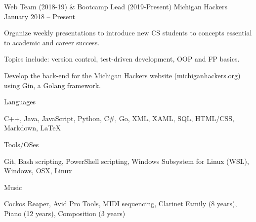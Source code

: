 \documentclass[]{awesome-cv}
\begin{document}
	\vspace{-4mm}
	\cventry
	{Web Team (2018-19) \& Bootcamp Lead (2019-Present)}
	{Michigan Hackers}
	{}
	{January 2018 – Present}
	{\begin{cvitems}
		\item {Organize weekly presentations to introduce new CS students to concepts essential to academic and career success.}
		\item {Topics include: version control, test-driven development, OOP and FP basics.}
		\item {Develop the back-end for the Michigan Hackers website (michiganhackers.org) using Gin, a Golang framework.}
		\end{cvitems}}
	\vspace{-4mm}



\vspace{-2mm}
	\cventry
	{}
	{Languages}
	{}
	{}
	{\begin{cvitems}
		\vspace{-7mm}
		\item {C++, Java, JavaScript, Python, C\#, Go, XML, XAML, SQL, HTML/CSS, Markdown, LaTeX}
		\end{cvitems}}

	\vspace{-8mm}
	\cventry
	{}
	{Tools/OSes}
	{}
	{}
	{\begin{cvitems}
		\vspace{-7mm}
		\item {Git, Bash scripting, PowerShell scripting, Windows Subsystem for Linux (WSL), Windows, OSX, Linux}
		\end{cvitems}}
	
	\vspace{-8mm}
	\cventry
	{}
	{Music}
	{}
	{}
	{\begin{cvitems}
		\vspace{-7mm}
		\item {Cockos Reaper, Avid Pro Tools, MIDI sequencing, Clarinet Family (8 years), Piano (12 years), Composition (3 years)}
		\end{cvitems}}
	\vspace{-4mm}
\end{document}
